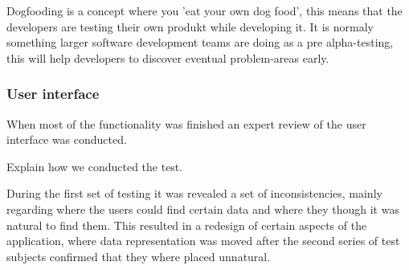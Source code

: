 Dogfooding is a concept where you 'eat your own dog food', this means that the developers are testing their own produkt while developing it. It is normaly something larger software development teams are doing as a pre alpha-testing, this will help developers to discover eventual problem-areas early.

\subsubsection{User interface}
When most of the functionality was finished an expert review of the user interface was conducted.

Explain how we conducted the test.

During the first set of testing it was revealed a set of inconsistencies, mainly regarding where the users could find certain data and where they though it was natural to find them. 
This resulted in a redesign of certain aspects of the application, where data representation was moved after the second series of test subjects confirmed that they where placed unnatural.